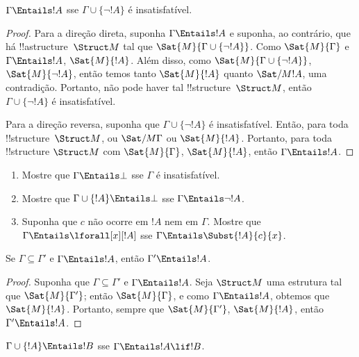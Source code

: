 \documentclass[../../../include/open-logic-section]{subfiles}
\begin{document}
\begin{prop}
$\Gamma \Entails !A$ sse $\Gamma \cup \{\lnot !A\}$ é insatisfatível.
\end{prop}

\begin{proof}
Para a direção direta, suponha $\Gamma \Entails !A$ e suponha, ao
contrário, que há !!a{structure}~$\Struct M$ tal que $\Sat{M}{\Gamma
  \cup \{ \lnot !A \}}$. Como $\Sat{M}{\Gamma}$ e $\Gamma \Entails
!A$, $\Sat{M}{!A}$. Além disso, como $\Sat{M}{\Gamma\cup \{ \lnot !A \}}$,
$\Sat{M}{\lnot !A}$, então temos tanto $\Sat{M}{!A}$ quanto $\Sat/{M}{!A}$,
uma contradição. Portanto, não pode haver tal !!{structure}~$\Struct M$, então
$\Gamma \cup \{ \lnot !A \}$ é insatisfatível.

Para a direção reversa, suponha que $\Gamma \cup \{ \lnot !A \}$ é
insatisfatível. Então, para toda !!{structure}~$\Struct M$, ou
$\Sat/{M}{\Gamma}$ ou $\Sat{M}{!A}$. Portanto, para toda !!{structure}
$\Struct M$ com $\Sat{M}{\Gamma}$, $\Sat{M}{!A}$, então $\Gamma \Entails
!A$.
\end{proof}

\begin{prob}
\begin{enumerate}
\item Mostre que $\Gamma \Entails \bot$ sse $\Gamma$ é insatisfatível.
\item Mostre que $\Gamma \cup \{!A\} \Entails \bot$ sse $\Gamma \Entails \lnot !A$.
\item Suponha que $c$ não ocorre em $!A$ nem em $\Gamma$. Mostre que
  $\Gamma \Entails \lforall[x][!A]$ sse $\Gamma \Entails
  \Subst{!A}{c}{x}$.
\end{enumerate}
\end{prob}

\begin{prop}
Se $\Gamma \subseteq \Gamma'$ e $\Gamma \Entails !A$, então $\Gamma'
\Entails !A$.
\end{prop}

\begin{proof}
Suponha que $\Gamma \subseteq \Gamma'$ e $\Gamma \Entails !A$. Seja
$\Struct M$ uma estrutura tal que $\Sat{M}{\Gamma'}$; então $\Sat{M}{\Gamma}$,
e como $\Gamma \Entails !A$, obtemos que $\Sat{M}{!A}$. Portanto,
sempre que $\Sat{M}{\Gamma'}$, $\Sat{M}{!A}$, então $\Gamma' \Entails !A$.
\end{proof}


\begin{thm}
$\Gamma \cup \{!A\} \Entails !B$ sse $\Gamma \Entails !A \lif !B$.
\end{thm}
\end{document}
